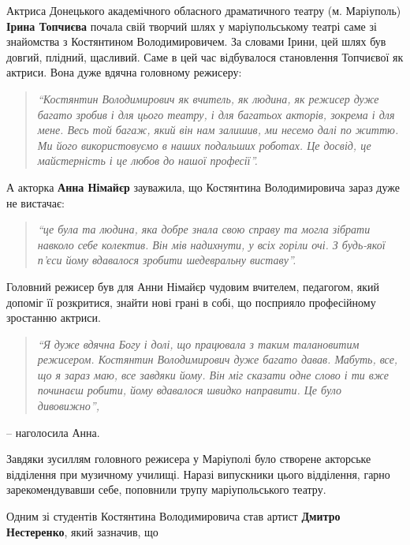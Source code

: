 
Актриса Донецького академічного обласного драматичного театру (м. Маріуполь)
\textbf{Ірина Топчиєва} почала свій творчий шлях у маріупольському театрі саме зі
знайомства з Костянтином Володимировичем. За словами Ірини, цей шлях був
довгий, плідний, щасливий. Саме в цей час відбувалося становлення Топчиєвої як
актриси. Вона дуже вдячна головному режисеру:

\begin{quote}
\em\enquote{Костянтин Володимирович як
вчитель, як людина, як режисер дуже багато зробив і для цього театру, і для
багатьох акторів, зокрема і для мене. Весь той багаж, який він нам залишив, ми
несемо далі по життю. Ми його використовуємо в наших подальших роботах. Це
досвід, це майстерність і це любов до нашої професії}.
\end{quote}

А акторка \textbf{Анна Німайєр} зауважила, що Костянтина Володимировича зараз дуже не
вистачає: 

\begin{quote}
\em\enquote{це була та людина, яка добре знала свою справу та могла зібрати
навколо себе колектив. Він мів надихнути, у всіх горіли очі. З будь-якої п’єси
йому вдавалося зробити шедевральну виставу}. 
\end{quote}

Головний режисер був для Анни Німайєр чудовим вчителем, педагогом, який допоміг
її розкритися, знайти нові грані в собі, що посприяло професійному зростанню
актриси.

\begin{quote}
\em\enquote{Я дуже вдячна Богу
і долі, що працювала з таким талановитим режисером. Костянтин Володимирович
дуже багато давав. Мабуть, все, що я зараз маю, все завдяки йому. Він міг
сказати одне слово і ти вже починаєш робити, йому вдавалося швидко направити.
Це було дивовижно}, 
\end{quote}
– наголосила Анна.


Завдяки зусиллям головного режисера у Маріуполі було створене акторське
відділення при музичному училищі. Наразі випускники цього відділення, гарно
зарекомендувавши себе, поповнили трупу маріупольського театру.

Одним зі студентів Костянтина Володимировича став артист \textbf{Дмитро Нестеренко},
який зазначив, що 

